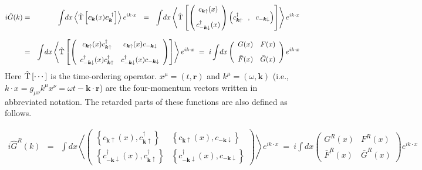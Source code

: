 \documentclass[uplatex,a4j,12pt,dvipdfmx]{jsarticle}
\begin{document}
\begin{eqnarray}
	i \hat{G}(k)
	&=&
	\int \! dx
	\left\langle \hat{\rm T} \left[ \bm{c}_{\bm{k}}(x) \bm{c}_{\bm{k}}^{\ \dagger} \right] \right\rangle
	e^{ i k \cdot x }
	\ \ = \ \
	\int \! dx
	\left\langle \hat{\rm T} \left[
		\left(
		\!\!
		\begin{array}{c}
				c_{\bm{k} \uparrow}(x)
				\\[3mm]
				c_{-\bm{k} \downarrow}^{\dagger}(x)
			\end{array}
		\!\!
		\right)
		\left( c_{\bm{k} \uparrow}^{\dagger} \ \ , \ \ c_{-\bm{k} \downarrow} \right)
		\right]
	\right\rangle
	e^{ i k \cdot x }
	\nonumber \\[3mm] &=&
	\int \! dx
	\left\langle \hat{\rm T} \left[
		\left(
		\begin{array}{cc}
			c_{\bm{k}\uparrow}(x) c_{\bm{k}\uparrow}^{\dagger}              & c_{\bm{k}\uparrow}(x) c_{-\bm{k}\downarrow}
			\\[3mm]
			c_{-\bm{k}\downarrow}^{\dagger}(x) c_{\bm{k}\uparrow}^{\dagger} & c_{-\bm{k}\downarrow}^{\dagger}(x) c_{-\bm{k}\downarrow}
		\end{array}
		\right)
		\right] \right\rangle
	e^{ i k \cdot x }
	\ = \
	i
	\int \! dx
	\left(
	\begin{array}{cc}
			G(x)       & F(x)
			\\[3mm]
			\bar{F}(x) & \bar{G}(x)
		\end{array}
	\right)
	e^{ i k \cdot x }
\end{eqnarray}
%
Here $\hat{\rm T} \left[ \cdots \right]$ is the time-ordering operator.
$x^{\mu}=(t,\bm{r})$ and $k^{\mu}=(\omega,\bm{k})$
(i.e., $k \cdot x = g_{\mu \nu} k^{\mu} x^{\nu} = \omega t- \bm{k} \cdot \bm{r}$)
are the four-momentum vectors written in abbreviated notation.
The retarded parts of these functions are also defined as follows.

\begin{eqnarray}
	i
	\hat{G}^{R}(k)
	&=&
	\int \! dx
	\left\langle
	\left(
	\begin{array}{cc}
			\left\{ c_{\bm{k}\uparrow}(x), c_{\bm{k}\uparrow}^{\dagger} \right\}              & \left\{ c_{\bm{k}\uparrow}(x), c_{-\bm{k}\downarrow} \right\}
			\\[3mm]
			\left\{ c_{-\bm{k}\downarrow}^{\dagger}(x), c_{\bm{k}\uparrow}^{\dagger} \right\} & \left\{ c_{-\bm{k}\downarrow}^{\dagger}(x), c_{-\bm{k}\downarrow} \right\}
		\end{array}
	\right)
	\right\rangle
	e^{ i k \cdot x }
	\ = \
	i
	\int \! dx
	\left(
	\begin{array}{cc}
			G^{R}(x)       & F^{R}(x)
			\\[3mm]
			\bar{F}^{R}(x) & \bar{G}^{R}(x)
		\end{array}
	\right)
	e^{ i k \cdot x }
\end{eqnarray}
%
\end{document}

